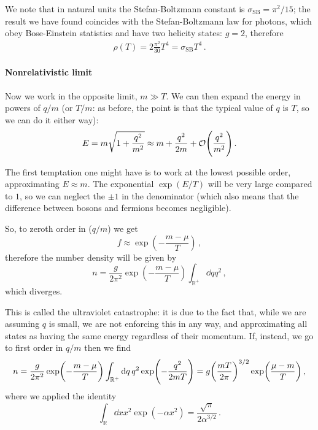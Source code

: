 \documentclass[main.tex]{subfiles}
\begin{document}
We note that in natural units the Stefan-Boltzmann constant is \(\sigma_{\text{SB}} = \pi^2 / 15\); the result we have found coincides with the Stefan-Boltzmann law for photons, which obey Bose-Einstein statistics and have two helicity states: \(g = 2\), therefore 
%
\begin{align}
\rho (T) = 2 \frac{\pi^2}{30 } T^{4} = \sigma_{\text{SB}} T^{4}
\,.
\end{align}

\paragraph{Nonrelativistic limit}

Now we work in the opposite limit, \(m \gg T\).
We can then expand the energy in powers of \(q/m\) (or \(T/m\): as before, the point is that the typical value of \(q\) is \(T\), so we can do it either way): 
%
\begin{align}
E = m \sqrt{1 + \frac{q^2}{m^2}} \approx m + \frac{q^2}{2m} + \mathcal{O}\qty( \frac{q^2}{m^2})
\,.
\end{align}

The first temptation one might have is to work at the lowest possible order, approximating \(E \approx m\). 
The exponential \(\exp(E / T)\) will be very large compared to \(1\), so we can neglect the \(\pm 1\) in the denominator (which also means that the difference between bosons and fermions becomes negligible).

So, to zeroth order in (\(q/m\)) we get 
%
\begin{equation}
  f \approx \exp(-\frac{m- \mu }{T}) 
\,,
\end{equation}
%
therefore the number density will be given by
%
\begin{equation}
  n = \frac{g}{2 \pi^2} \exp(-\frac{m- \mu }{T}) \int _{\mathbb{R}^{+}} \dd{q}q^2 
\,,
\end{equation}
%
which diverges.

This is called the ultraviolet catastrophe: it is due to the fact that, while we are assuming \(q\) is small, we are not enforcing this in any way, and approximating all states as having the same energy regardless of their momentum. If, instead, we go to first order in \(q/m\) then we find 
%
\begin{equation}
    n = \frac{g}{2 \pi^2} \exp(-\frac{m- \mu }{T}) \int _{\mathbb{R}^{+}} \dd{q}q^2 \exp(-\frac{q^2}{2mT}) 
    = g \qty(\frac{mT}{2 \pi })^{3/2} \exp(\frac{\mu - m}{T}) 
  \,,
\end{equation}
where we applied the identity 
%
\begin{equation}
  \int _{\mathbb{R}} \dd{x} x^2 \exp(-\alpha x^2) = \frac{\sqrt{\pi } }{2 \alpha^{3/2}} 
\,.
\end{equation}
%
\end{document}
